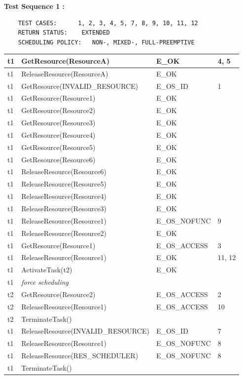 \documentclass[10pt]{article}
\newlength{\Li}\settowidth{\Li}{Running}
\newlength{\Lii}\setlength{\Lii}{7cm}
\newlength{\Liiii}\setlength{\Liiii}{0.9cm}
\newlength{\Liii}\setlength{\Liii}{\textwidth} \addtolength{\Liii}{-\Li} \addtolength{\Liii}{-\Lii} \addtolength{\Liii}{-\Liiii}
\begin{document}
	\textbf{Test Sequence 1 :} 
	\begin{lstlisting}
	TEST CASES:		 1, 2, 3, 4, 5, 7, 8, 9, 10, 11, 12
	RETURN STATUS:	  EXTENDED 
	SCHEDULING POLICY:   NON-, MIXED-, FULL-PREEMPTIVE
	\end{lstlisting}
	

	\begin{supertabular}{|p{\Li}|p{\Lii}|p{\Liii}|p{\Liiii}|} \hline 
	t1 & GetResource(ResourceA) 				& E\_OK			& 4, 5 \\ \hline 
	t1 & ReleaseResource(ResourceA) 			& E\_OK			& \\ \hline 
	t1 & GetResource(INVALID\_RESOURCE)	& E\_OS\_ID 		& 1 \\ \hline
	t1 & GetResource(Resource1) 				& E\_OK 			& \\ \hline
	t1 & GetResource(Resource2) 				& E\_OK 			& \\ \hline 
	t1 & GetResource(Resource3) 				& E\_OK  			& \\ \hline
	t1 & GetResource(Resource4) 				& E\_OK  			& \\ \hline
	t1 & GetResource(Resource5) 				& E\_OK  			& \\ \hline
	t1 & GetResource(Resource6) 				& E\_OK 			& \\ \hline
	t1 & ReleaseResource(Resource6) 			& E\_OK 			& \\ \hline
	t1 & ReleaseResource(Resource5) 			& E\_OK  			& \\ \hline
	t1 & ReleaseResource(Resource4) 			& E\_OK  			& \\ \hline
	t1 & ReleaseResource(Resource3) 			& E\_OK  			& \\ \hline
	t1 & ReleaseResource(Resource1) 			& E\_OS\_NOFUNC	& 9 \\ \hline 
	t1 & ReleaseResource(Resource2) 			& E\_OK 			& \\ \hline 
	t1 & GetResource(Resource1) 				& E\_OS\_ACCESS	& 3 \\ \hline
	t1 & ReleaseResource(Resource1) 			& E\_OK	& 11, 12  \\ \hline
	
	t1& ActivateTask(t2)						& E\_OK			& \\ \hline
	t1 & \textit{force scheduling}				& 		 		& \\ \hline 
	
	t2 & GetResource(Resource2) 				& E\_OS\_ACCESS	& 2 \\ \hline
	t2 & ReleaseResource(Resource1) 			& E\_OS\_ACCESS 	& 10 \\ \hline
	t2 & TerminateTask()					& 				&  \\ \hline

	t1 & ReleaseResource(INVALID\_RESOURCE) & E\_OS\_ID 		& 7 \\ \hline
	t1 & ReleaseResource(Resource1) 			& E\_OS\_NOFUNC 	& 8 \\ \hline
	t1 & ReleaseResource(RES\_SCHEDULER)	& E\_OS\_NOFUNC 	& 8 \\ \hline
	t1 & TerminateTask() 					& 				&  \\ \hline
	\end{supertabular} \\
	
\end{document}
